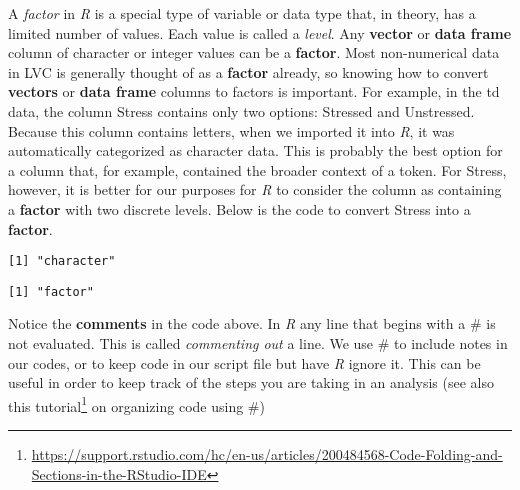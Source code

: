 \documentclass[
  10pt,
  letterpaper]{article}
\newenvironment{Shaded}{\begin{snugshade}}{\end{snugshade}}
\newcommand{\CommentTok}[1]{\textcolor[rgb]{0.37,0.37,0.37}{#1}}
\newcommand{\FunctionTok}[1]{\textcolor[rgb]{0.28,0.35,0.67}{#1}}
\newcommand{\NormalTok}[1]{\textcolor[rgb]{0.00,0.23,0.31}{#1}}
\newcommand{\OtherTok}[1]{\textcolor[rgb]{0.00,0.23,0.31}{#1}}
\newcommand{\SpecialCharTok}[1]{\textcolor[rgb]{0.37,0.37,0.37}{#1}}
\renewcommand\texttt[1]{{\ttfamily\color{BrickRed}#1}}
\DeclareRobustCommand{\href}[2]{#2\footnote{\url{#1}}}
\begin{document}
A \emph{factor} in \emph{R} is a special type of variable or data type
that, in theory, has a limited number of values. Each value is called a
\emph{level}. Any \textbf{vector} or \textbf{data frame} column of
\texttt{character} or \texttt{integer} values can be a \textbf{factor}.
Most non-numerical data in LVC is generally thought of as a
\textbf{factor} already, so knowing how to convert \textbf{vectors} or
\textbf{data frame} columns to factors is important. For example, in the
\texttt{td} data, the column \texttt{Stress} contains only two options:
\texttt{Stressed} and \texttt{Unstressed}. Because this column contains
letters, when we imported it into \emph{R}, it was automatically
categorized as \texttt{character} data. This is probably the best option
for a column that, for example, contained the broader context of a
token. For \texttt{Stress}, however, it is better for our purposes for
\emph{R} to consider the column as containing a \textbf{factor} with two
discrete levels. Below is the code to convert \texttt{Stress} into a
\textbf{factor}.

\begin{Shaded}
\end{Shaded}

\begin{verbatim}
[1] "character"
\end{verbatim}

\begin{Shaded}
\end{Shaded}

\begin{verbatim}
[1] "factor"
\end{verbatim}

Notice the \textbf{comments} in the code above. In \emph{R} any line
that begins with a \texttt{\#} is not evaluated. This is called
\emph{commenting out} a line. We use \texttt{\#} to include notes in our
codes, or to keep code in our script file but have \emph{R} ignore it.
This can be useful in order to keep track of the steps you are taking in
an analysis (see also
\href{https://support.rstudio.com/hc/en-us/articles/200484568-Code-Folding-and-Sections-in-the-RStudio-IDE}{this
tutorial} on organizing code using \texttt{\#})
\end{document}

